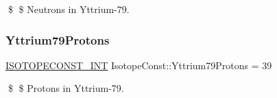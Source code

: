 \$ \$ Neutrons in Yttrium-\/79. \mbox{\label{group___isotope_const-_yttrium-_y79_gafc3092466f13ec3b068f76a9153d675c}} 
\subsubsection{\texorpdfstring{Yttrium79\+Protons}{Yttrium79Protons}}
{\footnotesize\ttfamily \mbox{\hyperlink{group___isotope_const-_macros_ga5f18360b3e99483a35c32d789e62621c}{I\+S\+O\+T\+O\+P\+E\+C\+O\+N\+S\+T\+\_\+\+I\+NT}} Isotope\+Const\+::\+Yttrium79\+Protons = 39}

\$ \$ Protons in Yttrium-\/79. 
